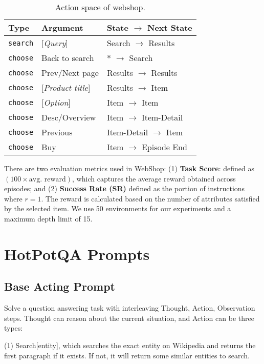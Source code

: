 \documentclass{article} \usepackage{iclr2024_conference,times}
\begin{document}
\begin{table}[ht]
    \centering
\begin{tabular}{lll}
\toprule
     Type &  Argument &  State $\rightarrow$ Next State \\
\midrule
    \texttt{search} & [\textit{Query}] & Search $\rightarrow$ Results\\ 
    \texttt{choose} & Back to search & $*$ $\rightarrow$ Search\\
    \texttt{choose} & Prev/Next page & Results $\rightarrow$ Results\\
    \texttt{choose} & [\textit{Product title}] & Results $\rightarrow$ Item\\
    \texttt{choose} & [\textit{Option}] & Item $\rightarrow$ Item\\
    \texttt{choose} & Desc/Overview & Item $\rightarrow$ Item-Detail\\
    \texttt{choose} & Previous & Item-Detail $\rightarrow$ Item\\
    \texttt{choose} & Buy & Item $\rightarrow$ Episode End\\
\bottomrule
\end{tabular}
\vspace{5pt}
\caption{Action space of webshop.}
\label{table:action_space_}
\end{table}

There are two evaluation metrics used in WebShop: (1) \textbf{Task Score}: defined as $(100 \times \text{avg. reward})$, which captures the average reward obtained across episodes; and (2) \textbf{Success Rate (SR)} defined as the portion of instructions where $r=1$. The reward is calculated based on the number of attributes satisfied by the selected item. We use 50 environments for our experiments and a maximum depth limit of 15.

\section{HotPotQA Prompts}
\label{sec:hotpotqa_prompt}
\subsection{Base Acting Prompt}

Solve a question answering task with interleaving Thought, Action, Observation steps. Thought can reason about the current situation, and Action can be three types: 

(1) Search[entity], which searches the exact entity on Wikipedia and returns the first paragraph if it exists. If not, it will return some similar entities to search.
\end{document}
